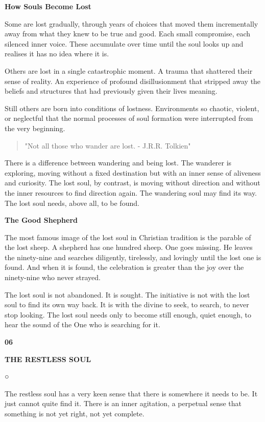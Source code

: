\textbf{How Souls Become Lost}

Some are lost gradually, through years of choices that moved them
incrementally away from what they knew to be true and good. Each small
compromise, each silenced inner voice. These accumulate over time until
the soul looks up and realises it has no idea where it is.

Others are lost in a single catastrophic moment. A trauma that shattered
their sense of reality. An experience of profound disillusionment that
stripped away the beliefs and structures that had previously given their
lives meaning.

Still others are born into conditions of lostness. Environments so
chaotic, violent, or neglectful that the normal processes of soul
formation were interrupted from the very beginning.

\begin{quote}
"Not all those who wander are lost. - J.R.R. Tolkien"
\end{quote}

There is a difference between wandering and being lost. The wanderer is
exploring, moving without a fixed destination but with an inner sense of
aliveness and curiosity. The lost soul, by contrast, is moving without
direction and without the inner resources to find direction again. The
wandering soul may find its way. The lost soul needs, above all, to be
found.

\textbf{The Good Shepherd}

The most famous image of the lost soul in Christian tradition is the
parable of the lost sheep. A shepherd has one hundred sheep. One goes
missing. He leaves the ninety-nine and searches diligently, tirelessly,
and lovingly until the lost one is found. And when it is found, the
celebration is greater than the joy over the ninety-nine who never
strayed.

The lost soul is not abandoned. It is sought. The initiative is not with
the lost soul to find its own way back. It is with the divine to seek,
to search, to never stop looking. The lost soul needs only to become
still enough, quiet enough, to hear the sound of the One who is
searching for it.

\textbf{06}

\textbf{THE RESTLESS SOUL}

○

The restless soul has a very keen sense that there is somewhere it needs
to be. It just cannot quite find it. There is an inner agitation, a
perpetual sense that something is not yet right, not yet complete.

